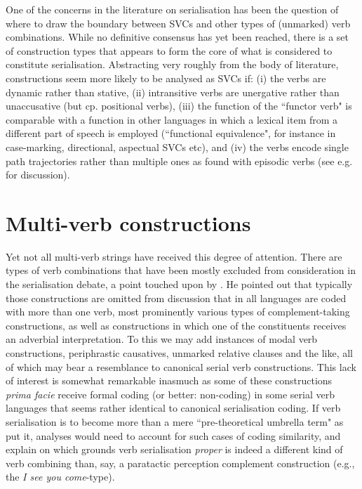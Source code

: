 One of the concerns in the literature on serialisation has been the question of where to draw the boundary between SVCs and other types of (unmarked) verb combinations. While no definitive consensus has yet been reached, there is a set of construction types that appears to form the core of what is considered to constitute serialisation. Abstracting very roughly from the body of literature, constructions seem more likely to be analysed as SVCs if: (i) the verbs are dynamic rather than stative, (ii) intransitive verbs are unergative rather than unaccusative (but cp. positional verbs), (iii) the function of the ``functor verb" is comparable with a function in other languages in which a lexical item from a different part of speech is employed (``functional equivalence", for instance in case-marking, directional, aspectual SVCs etc), and (iv) the verbs encode single path trajectories rather than multiple ones as found with episodic verbs (see e.g. \citealt{pawley2011event} for discussion). 

\section{Multi-verb constructions}

Yet not all multi-verb strings have received this degree of attention. There are types of verb combinations that have been mostly excluded from consideration in the serialisation debate, a point touched upon by \citet{givon1991serial}. He pointed out that typically those constructions are omitted from discussion that in all languages are coded with more than one verb, most prominently various types of complement-taking constructions, as well as constructions in which one of the constituents receives an adverbial interpretation. To this we may add instances of modal verb constructions, periphrastic causatives, unmarked relative clauses and the like, all of which may bear a resemblance to canonical serial verb constructions. This lack of interest is somewhat remarkable inasmuch as some of these constructions \emph{prima facie} receive formal coding (or better: non-coding) in some serial verb languages that seems rather identical to canonical serialisation coding. If verb serialisation is to become more than a mere ``pre-theoretical umbrella term" as \citet{zwicky1990we} put it, analyses would need to account for such cases of coding similarity, and explain on which grounds verb serialisation \textit{proper} is indeed a different kind of verb combining than, say, a paratactic perception complement construction (e.g., the \textit{I see you come}-type). 

